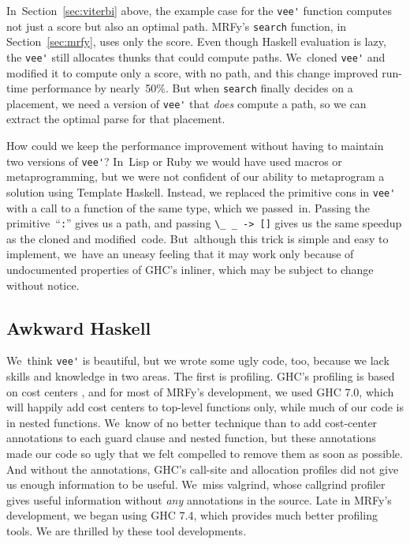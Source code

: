 \documentclass[nonatbib]{sigplanconf}
\newcommand\secref[1]{Section~\ref{sec:#1}}
\newcommand\seclabel[1]{\label{sec:#1}}
\let\cite\citep
\begin{document}
In~\secref{viterbi} above, the example case for the \verb+vee'+
function computes not just a score but also an optimal path.
MRFy's \texttt{search} function, in \secref{mrfy}, uses only the
score.
Even though Haskell evaluation is lazy, the \verb+vee'+ 
still allocates thunks that could compute paths.
We~cloned \verb+vee'+ and modified it to compute
only a score, with no path, and this change improved 
run-time performance by nearly~50\%.
But when \texttt{search} finally decides on a placement, we need a
version of \verb+vee'+ that \emph{does} compute a path, so we can
extract the optimal parse for that placement.

How could we keep the performance improvement without having to
maintain two versions of \verb+vee'+?
In~Lisp or Ruby we would have used macros or metaprogramming,
but we were not confident of our ability to metaprogram a solution
using Template Haskell.
Instead, we replaced the primitive cons in \verb+vee'+ with a
call to a function of the same type, which we passed~in.
Passing the primitive~``\texttt{:}'' gives us a path,
and passing \verb+\_ _ -> []+ gives us the same
speedup as the cloned and modified~code.
But~although
this trick is simple and easy to implement, 
we~have an uneasy feeling that it may work only because of undocumented
properties of GHC's inliner, which may be subject to change without
notice. 

\subsection{Awkward Haskell}

\seclabel{awkward-profiling}

We~think \verb+vee'+ is beautiful, but we wrote some ugly code, too,
because we lack skills and knowledge in two areas.
The first is profiling.
GHC's profiling is based on cost centers \cite{sansom-pj},
and for most of MRFy's development, we used GHC 7.0, which
will happily add cost centers to top-level 
functions only, while much of our code is in nested functions.
We~know of no better technique than to add cost-center annotations to
each guard clause and nested function,
but these annotations made our code so ugly that we felt compelled to
remove them as soon as possible.
And without the annotations, GHC's call-site and allocation
profiles did not give us enough information to be useful.
We~miss valgrind, whose callgrind profiler gives useful information
without \emph{any} annotations in the source.
Late in MRFy's development, we began using GHC 7.4, which provides much
better profiling tools.
We are thrilled by these tool developments.
\end{document}
